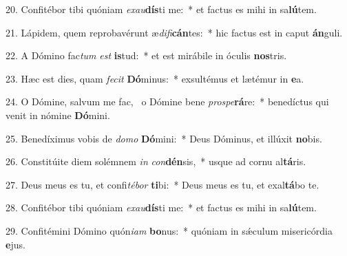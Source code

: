 20. Confitébor tibi quóniam \textit{ex}\textit{au}\textbf{dís}ti me:~*  et factus es mihi in sa\textbf{lú}tem.\

21. Lápidem, quem reprobavérunt æ\textit{di}\textit{fi}\textbf{cán}tes:~*  hic factus est in caput \textbf{án}guli.\

22. A Dómino fac\textit{tum} \textit{est} \textbf{is}tud:~*  et est mirábile in óculis \textbf{nos}tris.\

23. Hæc est dies, quam \textit{fe}\textit{cit} \textbf{Dó}minus:~*  exsultémus et lætémur in \textbf{e}a.\

24. O Dómine, salvum me fac, \dag\  o Dómine bene \textit{pro}\textit{spe}\textbf{rá}re:~*  benedíctus qui venit in nómine \textbf{Dó}mini.\

25. Benedíximus vobis de \textit{do}\textit{mo} \textbf{Dó}mini:~*  Deus Dóminus, et illúxit \textbf{no}bis.\

26. Constitúite diem solémnem \textit{in} \textit{con}\textbf{dén}sis,~*  usque ad cornu al\textbf{tá}ris.\

27. Deus meus es tu, et confi\textit{té}\textit{bor} \textbf{ti}bi:~*  Deus meus es tu, et exal\textbf{tá}bo te.\

28. Confitébor tibi quóniam \textit{ex}\textit{au}\textbf{dís}ti me:~*  et factus es mihi in sa\textbf{lú}tem.\

29. Confitémini Dómino quón\textit{i}\textit{am} \textbf{bo}nus:~*  quóniam in sǽculum misericórdia \textbf{e}jus.\

